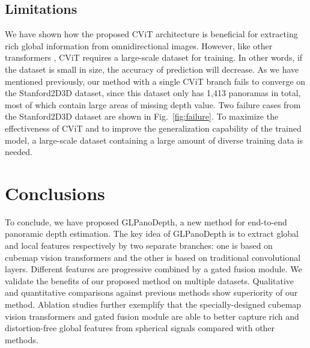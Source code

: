 \documentclass[10pt,twocolumn,letterpaper]{article}
\begin{document}
\subsection{Limitations}
We have shown how the proposed CViT architecture is beneficial for extracting rich global information from omnidirectional images. However, like other transformers \cite{vit}, CViT requires a large-scale dataset for training. In other words, if the dataset is small in size, the accuracy of prediction will decrease. As we have mentioned previously, our method with a single CViT branch fails to converge on the Stanford2D3D dataset, since this dataset only has 1,413 panoramas in total, most of which contain large areas of missing depth value. Two failure cases from the Stanford2D3D dataset are shown in Fig.~\ref{fig:failure}. To maximize the effectiveness of CViT and to improve the generalization capability of the trained model, a large-scale dataset containing a large amount of diverse training data is needed.


\section{Conclusions}
To conclude, we have proposed GLPanoDepth, a new method for end-to-end panoramic depth estimation. The key idea of GLPanoDepth is to extract global and local features respectively by two separate branches: one is based on cubemap vision transformers and the other is based on traditional convolutional layers. Different features are progressive combined by a gated fusion module.
We validate the benefits of our proposed method on multiple datasets. Qualitative and quantitative comparisons against previous methods show superiority of our method.
Ablation studies further exemplify that the specially-designed cubemap vision transformers and gated fusion module are able to better capture rich and distortion-free global features from spherical signals compared with other methods.


{\small


}
\end{document}
